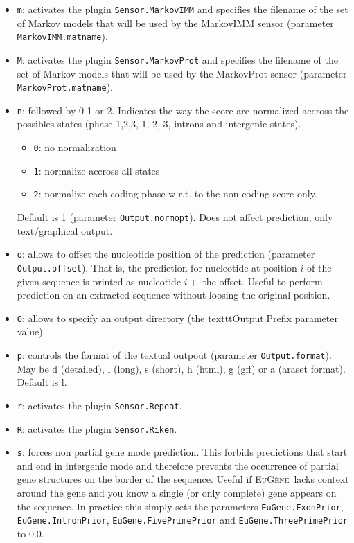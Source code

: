 \documentclass[a4paper,titlepage]{report}
\newcommand{\EuGene}{\textsc{EuG\`ene}}
\begin{document}
\begin{itemize}
\item \texttt{m}: activates the plugin \texttt{Sensor.MarkovIMM} and specifies 
  the filename of the set of Markov models that will
  be used by the MarkovIMM sensor (parameter \texttt{MarkovIMM.matname}).

\item \texttt{M}:  activates the plugin \texttt{Sensor.MarkovProt} and specifies 
  the filename of the set of Markov models that will
  be used by the MarkovProt sensor (parameter \texttt{MarkovProt.matname}).


\item \texttt{n}: followed by 0 1 or 2. Indicates the way the score are
  normalized accross the possibles states (phase 1,2,3,-1,-2,-3,
  introns and intergenic states). 
  \begin{itemize}
  \item \texttt{0}: no normalization
  \item \texttt{1}: normalize accross all states
  \item \texttt{2}: normalize each coding phase w.r.t. to the non coding
    score only.
  \end{itemize}
  Default is 1 (parameter \texttt{Output.normopt}). Does not affect
  prediction, only text/graphical output.
  
\item \texttt{o}: allows to offset the nucleotide position of the prediction
  (parameter \texttt{Output.offset}).  That is, the prediction for
  nucleotide at position $i$ of the given sequence is printed as
  nucleotide $i+$ the offset. Useful to perform prediction on an
  extracted sequence without loosing the original position.

\item \texttt{O}: allows to specify an output directory (the texttt{Output.Prefix} 
  parameter value).

\item \texttt{p}: controls the format of the textual outpout (parameter
  \texttt{Output.format}). May be d (detailed), l (long), s (short), h
  (html), g (gff) or a (araset format). Default is l.
    
\item \texttt{r}: activates the plugin \texttt{Sensor.Repeat}.

\item \texttt{R}: activates the plugin \texttt{Sensor.Riken}.
  
\item \texttt{s}: forces non partial gene mode prediction. This forbids
  predictions that start and end in intergenic mode and therefore
  prevents the occurrence of partial gene structures on the border of
  the sequence.  Useful if \EuGene\ lacks context around the gene and
  you know a single (or only complete) gene appears on the sequence.
  In practice this simply sets the parameters
  \texttt{EuGene.ExonPrior}, \texttt{EuGene.IntronPrior},
  \texttt{EuGene.FivePrimePrior} and \texttt{EuGene.ThreePrimePrior}
  to $0.0$. 
 

\end{itemize}
\end{document}
